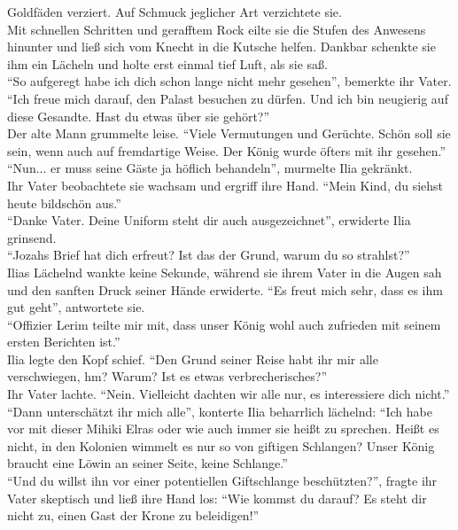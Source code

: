 Goldfäden verziert. Auf Schmuck jeglicher Art verzichtete sie. \\
Mit schnellen Schritten und gerafftem Rock eilte sie die Stufen des Anwesens hinunter und ließ sich 
vom Knecht in die Kutsche helfen. Dankbar schenkte sie ihm ein Lächeln und holte erst einmal tief 
Luft, als sie saß.\\
``So aufgeregt habe ich dich schon lange nicht mehr gesehen'', bemerkte ihr Vater.\\
``Ich freue mich darauf, den Palast besuchen zu dürfen. Und ich bin neugierig auf diese Gesandte. 
Hast du etwas über sie gehört?''\\
Der alte Mann grummelte leise. ``Viele Vermutungen und Gerüchte. Schön soll sie sein, wenn auch 
auf fremdartige Weise. Der König wurde öfters mit ihr gesehen.''\\
``Nun... er muss seine Gäste ja höflich behandeln'', murmelte Ilia gekränkt.\\
Ihr Vater beobachtete sie wachsam und ergriff ihre Hand. ``Mein Kind, du siehst heute bildschön 
aus.''\\
``Danke Vater. Deine Uniform steht dir auch ausgezeichnet'', erwiderte Ilia grinsend.\\
``Jozahs Brief hat dich erfreut? Ist das der Grund, warum du so strahlst?''\\
Ilias Lächelnd wankte keine Sekunde, während sie ihrem Vater in die Augen sah und den sanften Druck 
seiner Hände erwiderte. ``Es freut mich sehr, dass es ihm gut geht'', antwortete sie.\\
``Offizier Lerim teilte mir mit, dass unser König wohl auch zufrieden mit seinem ersten Berichten 
ist.''\\
Ilia legte den Kopf schief. ``Den Grund seiner Reise habt ihr mir alle verschwiegen, hm? Warum? Ist 
es etwas verbrecherisches?''\\
Ihr Vater lachte. ``Nein. Vielleicht dachten wir alle nur, es interessiere dich nicht.''\\
``Dann unterschätzt ihr mich alle'', konterte Ilia beharrlich lächelnd: ``Ich habe vor mit dieser 
Mihiki Elras oder wie auch immer sie heißt zu sprechen. Heißt es nicht, in den Kolonien wimmelt es 
nur so von giftigen Schlangen? Unser König braucht eine Löwin an seiner Seite, keine Schlange.''\\
``Und du willst ihn vor einer potentiellen Giftschlange beschützten?'', fragte ihr Vater skeptisch 
und ließ ihre Hand los: ``Wie kommst du darauf? Es steht dir nicht zu, einen Gast der Krone zu 
beleidigen!''\\
